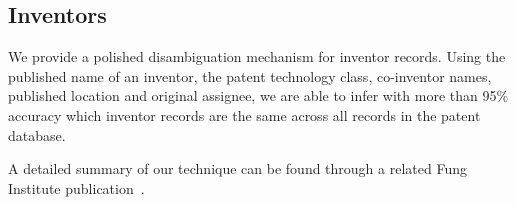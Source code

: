 \subsection{Inventors}

We provide a polished disambiguation mechanism for inventor records.
Using the published name of an inventor, the patent technology class,
co-inventor names, published location and original assignee, we are
able to infer with more than 95\% accuracy which inventor records
are the same across all records in the patent database.

A detailed summary of our technique can be found through a related
Fung Institute publication~\cite{newdisambiguation}. 

